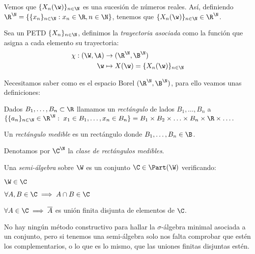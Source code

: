 Vemos que $\{X_n(\w)\}_{n\in\N}$ es una sucesión de números reales. Así, definiendo $\R^\N = \{ \{x_n\}_{n \in \N} : x_n \in \R, n \in \N\}$, tenemos que $\{X_n(\w)\}_{n \in \N} \in \R^\N$.

\begin{ndef}
  Sea un PETD $\{X_n\}_{n \in \N}$, definimos la \emph{trayectoria asociada} como la función que asigna a cada elemento su trayectoria:
  \begin{align*}
    \chi : (\W, \A) & \to (\R^\N, \B^\N) \\
    \w & \mapsto X(\w) = \{X_n(\w)\}_{n \in \N}
  \end{align*}
\end{ndef}

Necesitamos saber como es el espacio Borel $(\R^\N, \B^\N)$, para ello veamos unas definiciones:

\begin{ndef}[Rectángulo]
  Dados $B_1, \ldots, B_n \subset \R$ llamamos un \emph{rectángulo} de lados $B_1, \ldots, B_n$ a $\{ \{a_n\}_{n \in \N} \in \R^\N : \; x_1 \in B_1, \ldots, x_n \in B_n\} = B_1 \times B_2 \times \ldots \times B_n \times \R \times \ldots.$
\end{ndef}

\begin{ndef}
  Un \emph{rectángulo medible} es un rectángulo donde $B_1, \ldots, B_n \in \B$.
\end{ndef}

\begin{ndef}
  Denotamos por $\C^\N$ la \emph{clase de rectángulos medibles}.
\end{ndef}

\begin{ndef}
  Una \emph{semi-álgebra} sobre $\W$ es un conjunto $\C \in \Part(\W)$ verificando:
  \begin{nlist}
    \item $\W \in \C$
    \item $\forall A, B \in \C \implies A \cap B \in \C$
    \item $\forall A \in \C \implies \overline{A}$ es unión finita disjunta de elementos de $\C$.
  \end{nlist}
\end{ndef}

No hay ningún método constructivo para hallar la $\sigma$-álgebra minimal asociada a un conjunto, pero si tenemos una semi-álgebra solo nos falta comprobar que estén los complementarios, o lo que es lo mismo, que las uniones finitas disjuntas estén.

